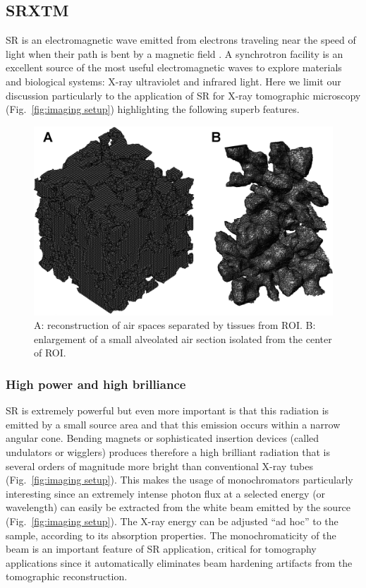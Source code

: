 \subsection{SRXTM}
\ac{SR} is an electromagnetic wave emitted from electrons traveling near the speed of light when their path is bent by a magnetic field \cite{Iida2003}. A synchrotron facility is an excellent source of the most useful electromagnetic waves to explore materials and biological systems: X-ray ultraviolet and infrared light. Here we limit our discussion particularly to the application of \ac{SR} for X-ray tomographic microscopy (Fig.~\ref{fig:imaging setup}) highlighting the following superb features.

\begin{figure}[htb]
	\centering
	\includegraphics[width=\imsize]{img/Tsuda2008/Tsuda-09}
	\caption[Three-dimensional reconstruction of air spaces]{A: reconstruction of \threed air spaces separated by tissues from \ac{ROI}. B: enlargement of a small alveolated air section isolated from the center of \ac{ROI}.}
	\label{fig:3dalveolated}
\end{figure}

\subsubsection{High power and high brilliance}
\ac{SR} is extremely powerful but even more important is that this radiation is emitted by a small source area and that this emission occurs within a narrow angular cone. Bending magnets or sophisticated insertion devices (called undulators or wigglers) produces therefore a high brilliant radiation that is several orders of magnitude more bright than conventional X-ray tubes (Fig.~\ref{fig:imaging setup}). This makes the usage of monochromators particularly interesting since an extremely intense photon flux at a selected energy (or wavelength) can easily be extracted from the white beam emitted by the source (Fig.~\ref{fig:imaging setup}). The X-ray energy can be adjusted ``ad hoc'' to the sample, according to its absorption properties. The monochromaticity of the beam is an important feature of \ac{SR} application, critical for tomography applications since it automatically eliminates beam hardening artifacts from the tomographic reconstruction.

